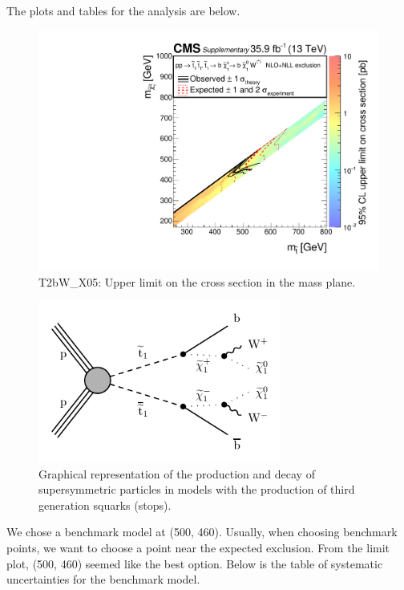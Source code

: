 The plots and tables for the analysis are below.

\begin{figure}[H]
\centering
\includegraphics[width=120mm]{./sec31/T2bW/T2bW_X05XSEC.pdf}
\caption{T2bW\_X05: Upper limit on the cross section in the mass plane.}
\end{figure}


\begin{figure}[H]
\centering
\includegraphics[width=80mm]{./sec31/T2bW/T2bW_Feynman.pdf}
\caption{Graphical representation of the production and decay of supersymmetric particles in models with the production of third generation squarks (stops).}
\end{figure}

We chose a benchmark model at (500, 460). Usually, when choosing benchmark points, we want to choose a point near the expected exclusion. From the limit plot, (500, 460) seemed like the best option. Below is the table of systematic uncertainties for the benchmark model.

